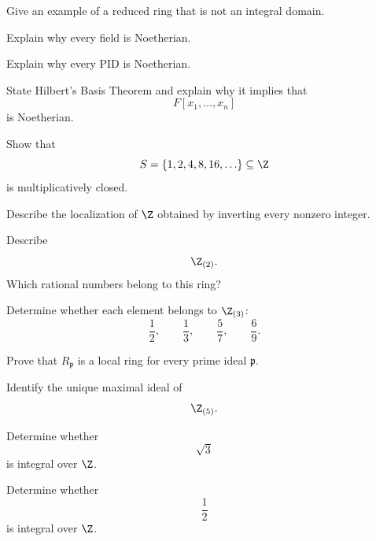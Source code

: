 \begin{exercise}[2]
Give an example of a reduced ring that is not an integral domain.
\end{exercise}

\begin{exercise}[1]
Explain why every field is Noetherian.
\end{exercise}

\begin{exercise}[1]
Explain why every PID is Noetherian.
\end{exercise}

\begin{exercise}[2]
State Hilbert's Basis Theorem and explain why it implies that
\[ F[x_1,\ldots,x_n] \]
is Noetherian.
\end{exercise}

\begin{exercise}[2]
Show that
\[ S=\{1,2,4,8,16,\ldots\}\subseteq\Z \]
is multiplicatively closed.
\end{exercise}

\begin{exercise}[1]
Describe the localization of \(\Z\) obtained by inverting every nonzero
integer.
\end{exercise}

\begin{exercise}[2]
Describe
\[ \Z_{(2)}. \]
Which rational numbers belong to this ring?
\end{exercise}

\begin{exercise}[2]
Determine whether each element belongs to \(\Z_{(3)}\):
\[ \frac12,\qquad\frac13,\qquad\frac57,\qquad\frac69. \]
\end{exercise}

\begin{exercise}[2]
Prove that \(R_{\mathfrak p}\) is a local ring for every prime ideal
\(\mathfrak p\).
\end{exercise}

\begin{exercise}[2]
Identify the unique maximal ideal of
\[ \Z_{(5)}. \]
\end{exercise}

\begin{exercise}[2]
Determine whether
\[ \sqrt{3} \]
is integral over \(\Z\).
\end{exercise}

\begin{exercise}[2]
Determine whether
\[ \frac12 \]
is integral over \(\Z\).
\end{exercise}

